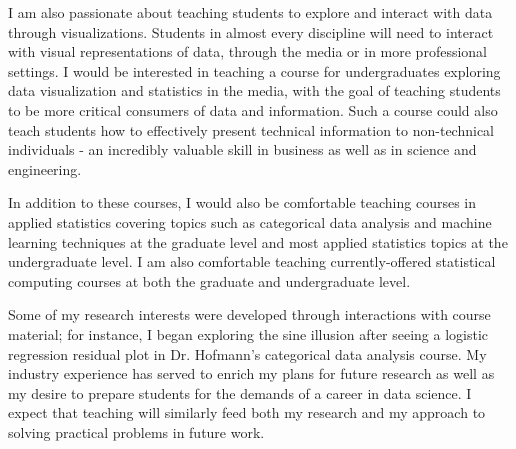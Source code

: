 \documentclass[12pt, letterpaper, sans]{moderncv}
\begin{document}
\vspace{.25cm}\hspace{8pt} I am also passionate about teaching students to explore and interact with data through visualizations. Students in almost every discipline will need to interact with visual representations of data, through the media or in more professional settings. I would be interested in teaching a course for undergraduates exploring data visualization and statistics in the media, with the goal of teaching students to be more critical consumers of data and information. Such a course could also teach students how to effectively present technical information to non-technical individuals - an incredibly valuable skill in business as well as in science and engineering. 

\vspace{.25cm}\hspace{8pt} In addition to these courses, I would also be comfortable teaching courses in applied statistics covering topics such as categorical data analysis and machine learning techniques at the graduate level and most applied statistics topics at the undergraduate level. I am also comfortable teaching currently-offered statistical computing courses at both the graduate and undergraduate level. 

Some of my research interests were developed through interactions with course material; for instance, I began exploring the sine illusion after seeing a logistic regression residual plot in Dr. Hofmann's categorical data analysis course. My industry experience has served to enrich my plans for future research as well as my desire to prepare students for the demands of a career in data science. I expect that teaching will similarly feed both my research and my approach to solving practical problems in future work. 
\end{document}
